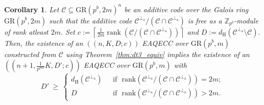 \documentclass{article}
\DeclareMathOperator{\rank}{rank}
\newtheorem{cor}{Corollary}[section]
\theoremstyle{remark}
\theoremstyle{definition}
\numberwithin{equation}{section}
\begin{document}
\begin{cor}\label{cor:same}  Let $\mathcal{C} \subseteq \text{GR}(p^b,2m)^{n}$ be an additive code over the Galois ring $\text{GR}(p^b,2m)$ such that the additive code $\mathcal{C}^{\perp_{\mathrm{a}}}/(\mathcal{C}  \cap  \mathcal{C}^{\perp_{\mathrm{a}}})$ is free as a $\mathbb{Z}_{p^b}$-module of rank atleast  $2m.$  Set $c:=\left\lceil \frac1{2m}\rank(\mathcal{C}/(\mathcal{C} \cap \mathcal{C}^{\perp_{\mathrm{a}}}))  \right\rceil$ and $D:=d_{\mathrm{H}}(\mathcal{C}^{\perp_{\mathrm{a}}}\setminus \mathcal{C} ).$  Then, the existence of an $((n,K,D;c))$ EAQECC over  $\text{GR}(p^b,m)$ constructed from $\mathcal{C}$ using Theorem~\ref{thm:dt3_equiv}   implies the existence of an $((n+1,\frac{1}{p^{bm}}K,D';c))$ EAQECC over $\text{GR}(p^b,m)$ with 
 \begin{equation*}
D'~\geq ~\left\{\begin{array}{ll}
d_{\mathrm{H}}(\mathcal{C}^{\perp_{\mathrm{a}}})  & \text{~~if~~}  \text{rank} (\mathcal{C}^{\perp_{\mathrm{a}}}/(\mathcal{C}  \cap  \mathcal{C}^{\perp_{\mathrm{a}}})) =2m; \\
D   & \text{~~if~~} \text{rank} (\mathcal{C}^{\perp_{\mathrm{a}}}/(\mathcal{C}  \cap  \mathcal{C}^{\perp_{\mathrm{a}}})) >2m.\,
\end{array}\right.
\end{equation*}
\end{cor}
\end{document}
